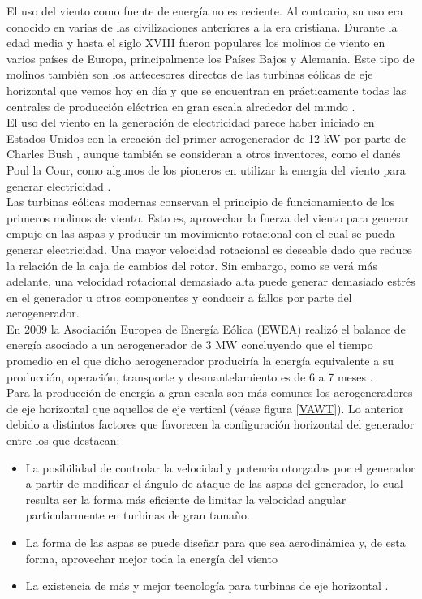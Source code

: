 {\parindent0pt El uso del viento como fuente de energía no es reciente. Al contrario, su uso era conocido en varias de las civilizaciones anteriores a la era cristiana. Durante la edad media y hasta el siglo XVIII fueron populares los molinos de viento en varios países de Europa, principalmente los Países Bajos y Alemania. Este tipo de molinos también son los antecesores directos de las turbinas eólicas de eje horizontal que vemos hoy en día y que se encuentran en prácticamente todas las centrales de producción eléctrica en gran escala alrededor del mundo \cite{Hau2013}.
\\

El uso del viento en la generación de electricidad parece haber iniciado en Estados Unidos con la creación del primer aerogenerador de 12 kW por parte de Charles Bush \cite{Burton2011}, aunque también se consideran a otros inventores, como el danés Poul la Cour, como algunos de los pioneros en utilizar la energía del viento para generar electricidad \cite{Hansen2015}.
\\

Las turbinas eólicas modernas conservan el principio de funcionamiento de los primeros molinos de viento. Esto es, aprovechar la fuerza del viento para generar empuje en las aspas y producir un movimiento rotacional con el cual se pueda generar electricidad. Una mayor velocidad rotacional es deseable dado que reduce la relación de la caja de cambios del rotor. Sin embargo, como se verá más adelante, una velocidad rotacional demasiado alta puede generar demasiado estrés en el generador u otros componentes y conducir a fallos por parte del aerogenerador. 
\\

En 2009 la Asociación Europea de Energía Eólica (EWEA) realizó el balance de energía asociado a un aerogenerador de 3 MW concluyendo que el tiempo promedio en el que dicho aerogenerador produciría la energía equivalente a su producción, operación, transporte y desmantelamiento es de 6 a 7 meses \cite{Burton2011}.
\\

Para la producción de energía a gran escala son más comunes los aerogeneradores de eje horizontal que aquellos de eje vertical (véase figura \ref{VAWT}). Lo anterior debido a distintos factores que favorecen la configuración horizontal del generador entre los que destacan:

\begin{itemize}
\item La posibilidad de controlar la velocidad y potencia otorgadas por el generador a partir de modificar el ángulo de ataque de las aspas del generador, lo cual resulta ser la forma más eficiente de limitar la velocidad angular particularmente en turbinas de gran tamaño.
\item La forma de las aspas se puede diseñar para que sea aerodinámica y, de esta forma, aprovechar mejor toda la energía del viento
\item La existencia de más y mejor tecnología para turbinas de eje horizontal \cite{Hau2013}.
\end{itemize}

}
